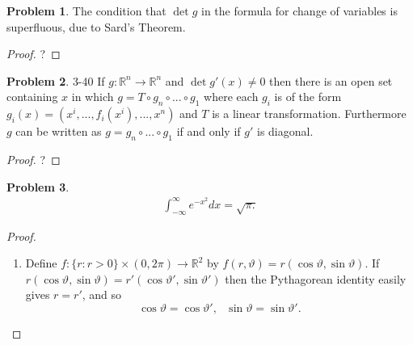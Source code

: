 \documentclass[20pt]{article}
\theoremstyle{plain}
\theoremstyle{definition}
\newtheorem*{problem}{Problem}
\newcommand{\reals}{\mathbb{R}}
\begin{document}
\begin{problem}{3.39}
  The condition that $\det g$ in the formula for change of variables is
  superfluous, due to Sard's Theorem.
\end{problem}
\begin{proof}
  \color{ForestGreen} ?
\end{proof}



\begin{problem}{3-40}
  If $g: \reals^n \to \reals^n$ and $\det g'(x) \neq 0$ then 
  there is an open set containing $x$ in which 
  $g = T \circ g_n \circ ... \circ g_1$ where each $g_i$
  is of the form $g_i(x) = (x^i, ..., f_i(x^i), ..., x^n)$
  and $T$ is a linear transformation.  Furthermore $g$ can be written as $g = g_n \circ...\circ g_1$ if and only if $g'$ is 
  diagonal.
\end{problem}

\begin{proof}
  \color{ForestGreen} ?
\end{proof}

\begin{problem}
  \begin{align}
    \int_{-\infty}^\infty e^{-x^2}dx = \sqrt{\pi.}
  \end{align}
\end{problem}

\begin{proof}
  \begin{enumerate}
    \item Define $f: \{r: r > 0 \} \times (0, 2\pi) \to \reals^2$ by
    $f(r, \vartheta) = r(\cos \vartheta, \sin \vartheta).$
    If $r(\cos \vartheta, \sin \vartheta) = r'(\cos \vartheta', \sin \vartheta')$
    then the Pythagorean identity easily gives $r = r'$, and so 
    $$\cos \vartheta = \cos \vartheta',\ \ \  \sin \vartheta = \sin \vartheta'.$$




  \end{enumerate}
\end{proof}
\end{document}
